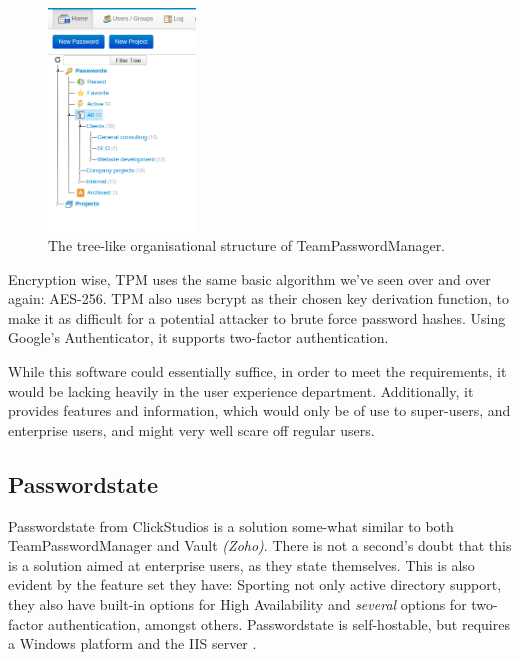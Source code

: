 			\begin{figure}[htbp]
				\centering
				\includegraphics[width=0.35\textwidth]{figures/analysis/teampasswordmanager_tree.png}
				\caption{The tree-like organisational structure of TeamPasswordManager.}
				\label{fig:teampasswordmanager_tree}
			\end{figure}

			Encryption wise, TPM uses the same basic algorithm we've seen over and over again: AES-256. TPM also uses bcrypt as their chosen key derivation function, to make it as difficult for a potential attacker to brute force password hashes. Using Google's Authenticator, it supports two-factor authentication.

			While this software could essentially suffice, in order to meet the requirements, it would be lacking heavily in the user experience department. Additionally, it provides features and information, which would only be of use to super-users, and enterprise users, and might very well scare off regular users.

		\subsection*{Passwordstate}
			Passwordstate from ClickStudios\cite{passwordstate} is a solution some-what similar to both TeamPasswordManager and Vault \emph{(Zoho)}. There is not a second's doubt that this is a solution aimed at enterprise users, as they state themselves. This is also evident by the feature set they have: Sporting not only active directory support, they also have built-in options for High Availability and \emph{several} options for two-factor authentication, amongst others. Passwordstate is self-hostable, but requires a Windows platform and the IIS server \cite{passwordstate_requirements}.

